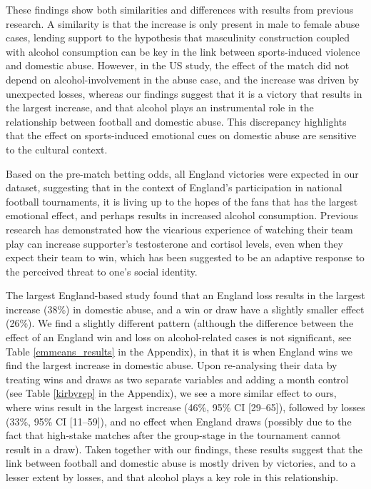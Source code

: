 \documentclass[12pt, letterpaper]{article}
\begin{document}
These findings show both similarities and differences with results from previous research. A similarity is that the increase is only present in male to female abuse cases, lending support to the hypothesis that masculinity construction coupled with alcohol consumption can be key in the link between sports-induced violence and domestic abuse. However, in the US study\autocite{Card2011}, the effect of the match did not depend on alcohol-involvement in the abuse case, and the increase was driven by unexpected losses, whereas our findings suggest that it is a victory that results in the largest increase, and that alcohol plays an instrumental role in the relationship between football and domestic abuse. This discrepancy highlights that the effect on sports-induced emotional cues on domestic abuse are sensitive to the cultural context. 

Based on the pre-match betting odds, all England victories were expected in our dataset, suggesting that in the context of England's participation in national football tournaments, it is living up to the hopes of the fans that has the largest emotional effect, and perhaps results in increased alcohol consumption\autocite{Davies2018}. Previous research has demonstrated how the vicarious experience of watching their team play can increase supporter's testosterone and cortisol levels, even when they expect their team to win, which has been suggested to be an adaptive response to the perceived threat to one's social identity\autocite{VanderMeij2012}.


The largest England-based study found that an England loss results in the largest increase (38\%) in domestic abuse, and a win or draw have a slightly smaller effect (26\%)\autocite{Kirby2014}. We find a slightly different pattern (although the difference between the effect of an England win and loss on alcohol-related cases is not significant, see Table \ref{emmeans_results} in the Appendix), in that it is when England wins we find the largest increase in domestic abuse. Upon re-analysing their data by treating wins and draws as two separate variables and adding a month control (see Table \ref{kirbyrep} in the Appendix), we see a more similar effect to ours, where wins result in the largest increase (46\%, 95\% CI [29--65]), followed by losses (33\%, 95\% CI [11--59]), and no effect when England draws (possibly due to the fact that high-stake matches after the group-stage in the tournament cannot result in a draw). Taken together with our findings, these results suggest that the link between football and domestic abuse is mostly driven by victories, and to a lesser extent by losses, and that alcohol plays a key role in this relationship.
\end{document}
